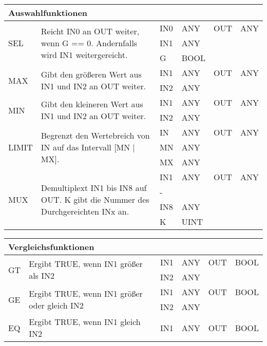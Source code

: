 {\begin{table}
\begin{tabular}{|m{2cm}|m{7cm}|>{\raggedright}m{0.75cm} >{\raggedleft}m{1cm}|>{\raggedright}m{0.75cm} >{\raggedleft\arraybackslash}m{1cm}|}
\multicolumn{6}{|l|}{\textbf{Auswahlfunktionen}}\\
\hline
\multirow{3}{*}{SEL}&\multirow{3}{7cm}{Reicht IN0 an OUT weiter, wenn G == 0. Andernfalls wird IN1 weitergereicht.}& IN0 & ANY & OUT & ANY\\
 & &IN1 & ANY & &\\
 & & G & BOOL & &\\
\hline
\multirow{2}{*}{MAX}&\multirow{2}{7cm}{Gibt den größeren Wert aus IN1 und IN2 an OUT weiter.}& IN1 & ANY & OUT & ANY\\
 & &IN2 & ANY & &\\
\hline
\multirow{2}{*}{MIN}&\multirow{2}{7cm}{Gibt den kleineren Wert aus IN1 und IN2 an OUT weiter.}& IN1 & ANY & OUT & ANY\\
 & &IN2 & ANY & &\\
\hline
\multirow{3}{*}{LIMIT}&\multirow{3}{7cm}{Begrenzt den Wertebreich von IN auf das Intervall [MN | MX].}& IN & ANY & OUT & ANY\\
 & & MN & ANY & &\\
 & & MX & ANY & &\\
\hline
\multirow{4}{*}{MUX}&\multirow{4}{7cm}{Demultiplext IN1 bis IN8 auf OUT. K gibt die Nummer des Durchgereichten INx an.}& IN1 & ANY & OUT & ANY\\
 & & - & & &\\ 
 & & IN8 & ANY & &\\
 & & K & UINT & &\\
\hline
\end{tabular}
\renewcommand{\arraystretch}{1}
\end{table}
\begin{table}
\centering
\renewcommand{\arraystretch}{1.2}
\begin{tabular}{|m{2cm}|m{7cm}|>{\raggedright}m{0.75cm} >{\raggedleft}m{1cm}|>{\raggedright}m{0.75cm} >{\raggedleft\arraybackslash}m{1cm}|}
\hline
\multicolumn{6}{|l|}{\textbf{Vergleichsfunktionen}}\\
\hline
\multirow{2}{*}{GT}&\multirow{2}{7cm}{Ergibt TRUE, wenn IN1 größer als IN2}& IN1 & ANY & OUT & BOOL\\
 & &IN2 & ANY & &\\
\hline
\multirow{2}{*}{GE}&\multirow{2}{7cm}{Ergibt TRUE, wenn IN1 größer oder gleich IN2}& IN1 & ANY & OUT & BOOL\\
 & &IN2 & ANY & &\\
\hline
\multirow{2}{*}{EQ}&\multirow{2}{7cm}{Ergibt TRUE, wenn IN1 gleich IN2}& IN1 & ANY & OUT & BOOL\\

\end{tabular}
\end{table}}
